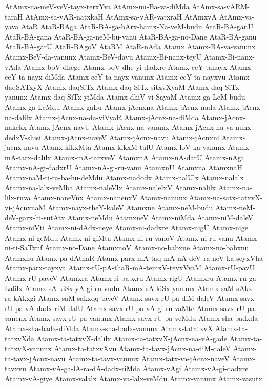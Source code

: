 {AtAmx-na-meV-veV-tayx-terxYva
AtAmx-nu-Ba-va-diMda
AtAmx-sa-vARM-taraH
AtAmx-sa-vAR-natxkaH
AtAmx-sa-vAR-vatxraH
AtAmxvA
AtAmx-va-yava
AtaR
AtaR-BAga
AtaR-BA-ga-bArx-hamx-Na-veM-budu
AtaR-BA-ganU
AtaR-BA-gana
AtaR-BA-ga-neM-bu-vanu
AtaR-BA-ga-no-Dane
AtaR-BA-ganu
AtaR-BA-garU
AtaR-BAgoV
AtaRM
AtaR-nAda
Atamx
Atamx-BA-va-vanunx
Atamx-BeV-da-vanunx
Atamx-BeV-davu
Atamx-Bi-nanx-teyU
Atamx-Bi-nanx-vAda
Atamx-boV-dhege
Atamx-boV-dhe-yi-dadxre
Atamx-ceY-tanayx
Atamx-ceY-ta-nayx-diMda
Atamx-ceY-ta-nayx-vanunx
Atamx-ceY-ta-nayxvu
Atamx-daqSATxyX
Atamx-daqSiTx
Atamx-daq-SiTx-sitxvXyaM
Atamx-daq-SiTx-yanunx
Atamx-daq-SiTx-yiMda
Atamx-dhiV-vi-SayaM
Atamx-ga-LeM-budu
Atamx-ga-LeMdu
Atamx-gaLu
Atamx-jAcnxna
Atamx-jAcnx-nada
Atamx-jAcnx-na-dalilx
Atamx-jAcnx-na-da-viVyaR
Atamx-jAcnx-na-diMda
Atamx-jAcnx-nakekx
Atamx-jAcnx-navU
Atamx-jAcnx-na-vanunx
Atamx-jAcnx-na-va-nunx-dedxV-shisi
Atamx-jAcnx-naveV
Atamx-jAcnx-navu
Atamx-jAcnxni
Atamx-jacnx-navu
Atamx-kikxMta
Atamx-kikxM-talU
Atamx-loV-ka-vanunx
Atamx-mA-tarx-dalilx
Atamx-mA-tarxveV
AtamxnA
Atamx-nA-darU
Atamx-nAgi
Atamx-nA-gi-dadxrU
Atamx-nA-gi-ru-vanu
AtamxnU
Atamxna
AtamxnaH
Atamx-naM-ti-ra-ba-hu-deMdu
Atamx-nadodx
Atamx-nalUlx
Atamx-nalalx
Atamx-na-lalx-veMba
Atamx-naleVlx
Atamx-nalelxV
Atamx-nalilx
Atamx-na-lilx-ruva
Atamx-naneVnx
Atamx-nanenxV
Atamx-nanunx
Atamx-na-satx-tatxvX-vi-jAcnxnaM
Atamx-nayx-theY-kaleV
Atamxne
Atamx-neM-budu
Atamx-neM-deV-garx-hi-sutAtx
Atamx-neMdu
AtamxneV
Atamx-niMda
Atamx-niM-daleV
Atamx-niVti
Atamx-ni-dAdx-neye
Atamx-ni-dadxre
Atamx-nigU
Atamx-nige
Atamx-ni-geMdu
Atamx-ni-giMta
Atamx-ni-ru-vanoV
Atamx-ni-ru-vanu
Atamx-ni-ti-SaTxnf
Atamx-no-Dane
AtamxnoV
Atamx-no-babxne
Atamx-no-babxnu
Atamxnu
Atamx-pa-dAthaR
Atamx-parx-mA-taq-mA-nA-deV-ra-neV-ka-seyxVha
Atamx-parx-tayxya
Atamx-rU-pA-thaR-mA-temxV-teyxVvaM
Atamx-rU-pavU
Atamx-rU-paveV
Atamxra
Atamx-ri-babxru
Atamx-rigU
Atamxru
Atamx-ru-ga-Lalilx
Atamx-sA-kiSx-yA-gi-ru-vudu
Atamx-sA-kiSx-yanunx
Atamx-saM-sAkx-ra-kAkxgi
Atamx-saM-sakxqq-tayeV
Atamx-savx-rU-pa-diM-daleV
Atamx-savx-rU-pa-vA-dadx-riM-dalU
Atamx-savx-rU-pa-vA-gi-ru-vaMte
Atamx-savx-rU-pa-vanenx
Atamx-savx-rU-pa-vanunx
Atamx-savx-rU-pa-veMdu
Atamx-sha-badxda
Atamx-sha-badx-diMda
Atamx-sha-badx-vanunx
Atamx-tatatxvX
Atamx-ta-tatxvXda
Atamx-ta-tatxvX-dalilx
Atamx-ta-tatxvX-jAcnx-na-vA-gade
Atamx-ta-tatxvX-vanunx
Atamx-ta-tatxvXvu
Atamx-ta-tavx-jAcnx-na-diM-daleV
Atamx-ta-tavx-jAcnx-navu
Atamx-ta-tavx-vanunx
Atamx-tatx-va-jAcnx-naveV
Atamx-tavxvu
Atamx-vA-ga-lA-ra-dA-dadx-riMda
Atamx-vAgi
Atamx-vA-gi-dadxre
Atamx-vA-giye
Atamx-valalx
Atamx-va-lalx-veMdu
Atamx-vanunx
Atamx-vasutx
}
